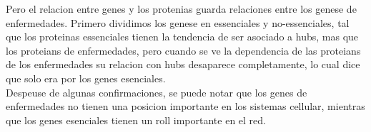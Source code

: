\documentclass[a4paper, 12pt]{report}
\begin{document}
Pero el relacion entre genes y los protenias guarda relaciones entre los genese de enfermedades.
Primero dividimos los genese en essenciales y no-essenciales, tal que los proteinas
essenciales tienen la tendencia de ser asociado a hubs, mas que los proteians de enfermedades,
pero cuando se ve la dependencia de las proteians de los enfermedades su relacion con hubs
desaparece completamente, lo cual dice que solo era por los genes esenciales. \\

Despeuse de algunas confirmaciones, se puede notar que los genes de enfermedades no tienen
una posicion importante en los sistemas cellular, mientras que los genes esenciales tienen
un roll importante en el red.
\end{document}

